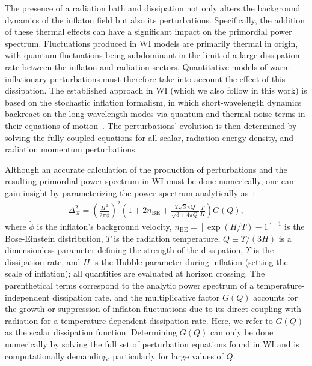 \documentclass[a4paper,11pt]{article}
\begin{document}
The presence of a radiation bath and dissipation not only alters the background dynamics of the inflaton field but also its perturbations. Specifically, the addition of these thermal effects can have a significant impact on the primordial power spectrum.  Fluctuations produced in WI models are primarily thermal in origin, with quantum fluctuations being subdominant in the limit of a large dissipation rate between the inflaton and radiation sectors. Quantitative models of warm inflationary perturbations must therefore take into account the effect of this dissipation. The established approach in WI (which we also follow in this work) is based on the stochastic inflation formalism, in which short-wavelength dynamics backreact on the long-wavelength modes via quantum and thermal noise terms in their equations of motion~\cite{Ramos:2013nsa}. The perturbations' evolution is then determined by solving the fully coupled equations for all scalar, radiation energy density, and radiation momentum perturbations.  

Although an accurate calculation of the production of perturbations and the resulting primordial power spectrum in WI must be done numerically,
 one can gain insight by parameterizing the power spectrum analytically as~\cite{Hall:2003zp, Graham:2009bf, Bastero-Gil:2011rva, Ramos:2013nsa}:
\begin{align}
    \Delta_{\mathcal{R}}^{2}=\left(\frac{H^{2}}{2 \pi \dot{\phi}}\right)^{2}\left(1 + 2 n_{\mathrm{BE}}+\frac{2 \sqrt{3} \pi Q}{\sqrt{3+4 \pi Q}} \frac{T}{H}\right) G(Q),
\label{eq:defG}
\end{align}
where $\dot\phi$ is the inflaton's background velocity, $n_{\mathrm{BE}} = [\exp(H/T )-1]^{-1}$ is the Bose-Einstein distribution, $T$ is the radiation temperature,  $Q\equiv \Upsilon/(3H)$ is a dimensionless parameter defining the strength of the dissipation, $\Upsilon$ is the dissipation rate, and $H$ is the Hubble parameter during inflation (setting the scale of inflation); all quantities are evaluated at horizon crossing. The parenthetical terms correspond to the analytic power spectrum of a temperature-independent dissipation rate, and the multiplicative factor $G(Q)$ accounts for the growth or suppression of inflaton fluctuations due to its direct coupling with radiation for a temperature-dependent dissipation rate. Here, we refer to $G(Q)$ as the scalar dissipation function. Determining $G(Q)$ can only be done numerically by solving the full set of perturbation equations found in WI  and is computationally demanding, particularly for large values of $Q$.
\end{document}
